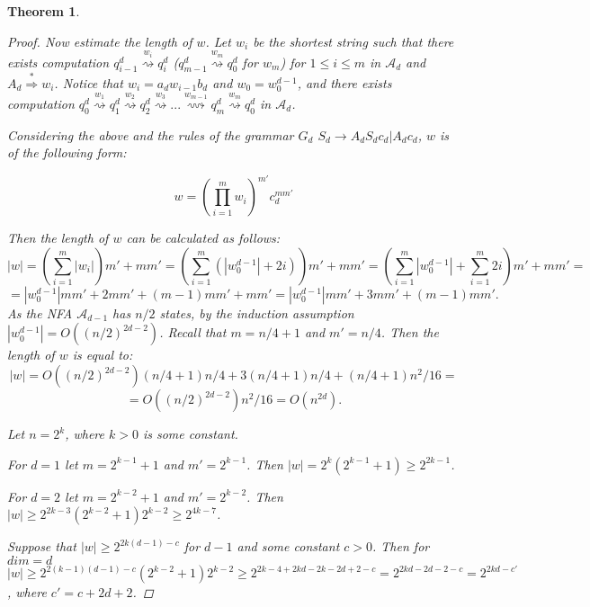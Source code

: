 \documentclass[11pt,a4paper]{article} %
\newcommand{\xra}[1]{\overset{#1}{\rightsquigarrow}}
\newtheorem{theorem}{Theorem}
\begin{document}
\begin{theorem}
\begin{proof}
Now estimate the length of $w$. Let $w_i$ be the shortest string such that there exists computation $q^{d}_{i-1} \xra{w_i} q^d_i$ ($q^{d}_{m-1} \xra{w_m} q^d_0$ for $w_m$) for $1\leq i \leq m$ in $\mathcal{A}_{d}$ and $A_d  \stackrel {*}{\Rightarrow }  w_i$. Notice that $w_i = a_d w_{i-1} b_d$ and $w_0 = w_0^{d-1}$, and there exists computation $q^{d}_{0} \xra{w_1} q^d_1  \xra{w_2} q^d_2 \xra{w_3} ... \xra{w_{m-1}} q^{d}_{m} \xra{w_m} q^d_0$ in $\mathcal{A}_{d}$.

Considering the above and the rules of the grammar $G_d$ $S_d \rightarrow A_dS_dc_d\vert A_dc_d$, $w$ is of the following form:

$$w = ({\prod_{i=1}^m w_i})^{m'}{c}_d^{mm'}$$

Then the length of $w$ can be calculated as follows:
$$|w| = ({\sum_{i=1}^m |w_i|})m' + mm' = (\sum_{i=1}^m (|w_0^{d-1}| + 2i))m' + mm'  = 
(\sum_{i=1}^m |w_0^{d-1}| + \sum_{i=1}^m 2i)m' + mm' = $$
$$ =  |w_0^{d-1}| m m' + 2mm' + (m-1)mm' + mm' = |w_0^{d-1}| m m' + 3mm' + (m-1)mm'.
$$
As the NFA $\mathcal{A}_{d-1}$ has $n/2$ states, by the induction assumption $|w_0^{d-1}| =O( (n/2)^{2d - 2})$. Recall that $m = n/4 +1$ and $m' = n/4$. Then the length of $w$ is equal to:
$$|w| = O((n/2)^{2d - 2}) (n/4 + 1) n/4 + 3(n/4 + 1) n/4 + (n/4 + 1) n^2/16  =$$ $$= O((n/2)^{2d - 2}) n^2/16 = O(n^{2d}).$$

Let $n = 2^k$, where $k > 0$ is some constant.

For $d=1$ let $m = 2^{k-1} + 1$ and $m'= 2^{k-1}$.  Then $|w| = 2^k(2^{k-1} + 1) \ge 2^{2k-1}$.

For $d=2$ let $m = 2^{k-2} + 1$ and $m'= 2^{k-2}$.  Then $|w| \ge 2^{2k-3} (2^{k-2} + 1)2^{k-2} \ge 2^{4k - 7}$.

Suppose that $|w| \ge 2^{2k(d-1)-c}$ for $d-1$ and some constant $c > 0$. Then for $dim = d$ $|w| \ge 2^{2(k-1)(d-1)-c}(2^{k-2}+1)2^{k-2} \ge 2^{2k-4+2kd-2k-2d+2-c} = 2^{2kd-2d-2-c} = 2^{2kd - c'}$, where $c' = c + 2d + 2$.
\end{proof}
\end{theorem}
\end{document}
